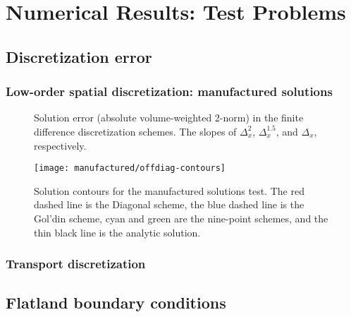 
\chapter{Numerical Results: Test Problems}\label{chap:simpleNumericalResults}


\section{Discretization error}

\subsection{Low-order spatial discretization: manufactured solutions}

\begin{figure}[htb]
  \centering\small
  
  \caption[Solution error (absolute volume-weighted 2-norm) in the
  finite difference discretization schemes.]{Solution error (absolute
  volume-weighted 2-norm) in the finite difference discretization schemes. The
  slopes of $\Delta_x^{2}$, $\Delta_x^{1.5}$, and
  $\Delta_x$, respectively.}
  \label{fig:manuConvergence}
\end{figure}

\begin{figure}[htb]
  \centering
  \texttt{[image: manufactured/offdiag-contours]}
  \caption[Solution contours for the manufactured solutions test.]{
  Solution contours for the manufactured solutions test. The red dashed line is
  the Diagonal scheme, the blue dashed line is the Gol'din scheme, cyan and green
  are the nine-point schemes, and the thin black line is the analytic solution.}
  \label{fig:manuSolution}
\end{figure}

\subsection{Transport discretization}

\section{Flatland boundary conditions}

